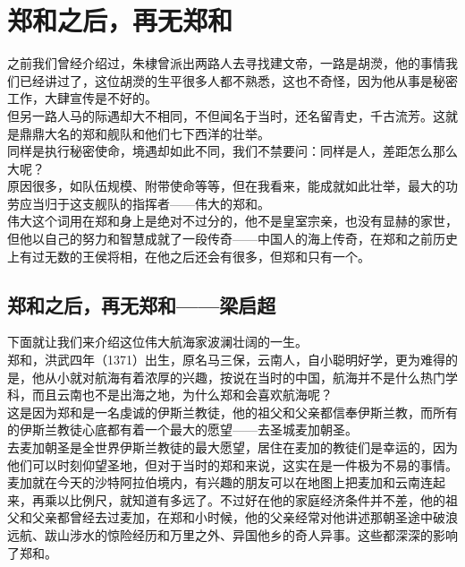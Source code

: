 \section{郑和之后，再无郑和}
\ifnum{}
	\begin{multicols}{\theparacolNo}
\fi
之前我们曾经介绍过，朱棣曾派出两路人去寻找建文帝，一路是胡濙，他的事情我们已经讲过了，这位胡濙的生平很多人都不熟悉，这也不奇怪，因为他从事是秘密工作，大肆宣传是不好的。\\

但另一路人马的际遇却大不相同，不但闻名于当时，还名留青史，千古流芳。这就是鼎鼎大名的郑和舰队和他们七下西洋的壮举。\\

同样是执行秘密使命，境遇却如此不同，我们不禁要问：同样是人，差距怎么那么大呢？\\

原因很多，如队伍规模、附带使命等等，但在我看来，能成就如此壮举，最大的功劳应当归于这支舰队的指挥者——伟大的郑和。\\

伟大这个词用在郑和身上是绝对不过分的，他不是皇室宗亲，也没有显赫的家世，但他以自己的努力和智慧成就了一段传奇——中国人的海上传奇，在郑和之前历史上有过无数的王侯将相，在他之后还会有很多，但郑和只有一个。\\

\subsection{郑和之后，再无郑和——梁启超}
下面就让我们来介绍这位伟大航海家波澜壮阔的一生。\\

郑和，洪武四年（1371）出生，原名马三保，云南人，自小聪明好学，更为难得的是，他从小就对航海有着浓厚的兴趣，按说在当时的中国，航海并不是什么热门学科，而且云南也不是出海之地，为什么郑和会喜欢航海呢？\\

这是因为郑和是一名虔诚的伊斯兰教徒，他的祖父和父亲都信奉伊斯兰教，而所有的伊斯兰教徒心底都有着一个最大的愿望——去圣城麦加朝圣。\\

去麦加朝圣是全世界伊斯兰教徒的最大愿望，居住在麦加的教徒们是幸运的，因为他们可以时刻仰望圣地，但对于当时的郑和来说，这实在是一件极为不易的事情。麦加就在今天的沙特阿拉伯境内，有兴趣的朋友可以在地图上把麦加和云南连起来，再乘以比例尺，就知道有多远了。不过好在他的家庭经济条件并不差，他的祖父和父亲都曾经去过麦加，在郑和小时候，他的父亲经常对他讲述那朝圣途中破浪远航、跋山涉水的惊险经历和万里之外、异国他乡的奇人异事。这些都深深的影响了郑和。\\


\end{multicols}
